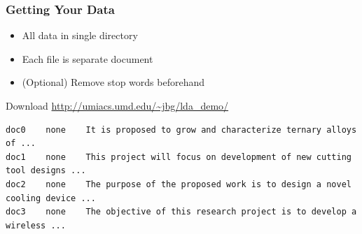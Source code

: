 \begin{frame}[fragile]


\frametitle {Getting Your Data}


\begin{itemize}
	\item All data in single directory
	\item Each file is separate document
	\item (Optional) Remove stop words beforehand
\end{itemize}


\begin{block}{Download}
  \url{http://umiacs.umd.edu/~jbg/lda_demo/}
\end{block}

\pause \pause \pause \pause 
\begin{lstlisting}
doc0    none    It is proposed to grow and characterize ternary alloys of ...
doc1    none    This project will focus on development of new cutting tool designs ...
doc2    none    The purpose of the proposed work is to design a novel cooling device ...
doc3    none    The objective of this research project is to develop a wireless ...
\end{lstlisting}

\end{frame}


